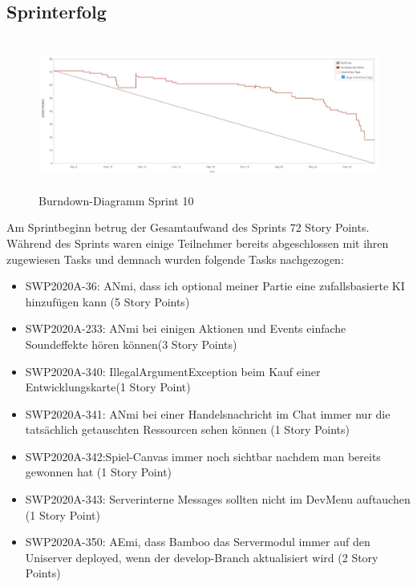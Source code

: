\documentclass[12pt,a4paper, oneside]{article}
\begin{document}
    \newpage

    \subsection{Sprinterfolg}
    \begin{figure}[h]
        \centering
        \includegraphics[width=\textwidth, height=5cm]{../img/sprint_10/Burndown-Sprint10.PNG}
        \caption{Burndown-Diagramm Sprint 10}
        \label{fig: Burndown-Sprint 10}
    \end{figure}

    \noindent
    Am Sprintbeginn betrug der Gesamtaufwand des Sprints 72 Story Points. Während des Sprints waren einige Teilnehmer bereits abgeschlossen mit ihren zugewiesen Tasks und demnach wurden folgende Tasks nachgezogen:

    \begin{itemize}

        \item SWP2020A-36: ANmi, dass ich optional meiner Partie eine zufallsbasierte KI hinzufügen kann (5 Story Points)
        \item SWP2020A-233: ANmi bei einigen Aktionen und Events einfache Soundeffekte hören können(3 Story Points)

        \item SWP2020A-340: IllegalArgumentException beim Kauf einer Entwicklungskarte(1 Story Point)

        \item SWP2020A-341: ANmi bei einer Handelsnachricht im Chat immer nur die tatsächlich getauschten Ressourcen sehen können (1 Story Points)

        \item SWP2020A-342:Spiel-Canvas immer noch sichtbar nachdem man bereits gewonnen hat (1 Story Point)

        \item SWP2020A-343: Serverinterne Messages sollten nicht im DevMenu auftauchen (1 Story Point)

        \item SWP2020A-350: AEmi, dass Bamboo das Servermodul immer auf den Uniserver deployed, wenn der develop-Branch aktualisiert wird (2 Story Points)

    \end{itemize}
\end{document}
